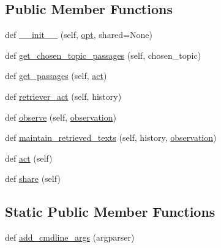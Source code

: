 \subsection*{Public Member Functions}
\begin{DoxyCompactItemize}
\item 
def \hyperlink{classinteractive__end2end_1_1interactive__end2end_1_1InteractiveEnd2endAgent_ac0b40a7b2374f7b0dca4c123e0cfc2ed}{\+\_\+\+\_\+init\+\_\+\+\_\+} (self, \hyperlink{classinteractive__end2end_1_1interactive__end2end_1_1InteractiveEnd2endAgent_a85ea739abdd803414abe3e131c0965dd}{opt}, shared=None)
\item 
def \hyperlink{classinteractive__end2end_1_1interactive__end2end_1_1InteractiveEnd2endAgent_ad8ef18518675b9aa72280547b56d3a1e}{get\+\_\+chosen\+\_\+topic\+\_\+passages} (self, chosen\+\_\+topic)
\item 
def \hyperlink{classinteractive__end2end_1_1interactive__end2end_1_1InteractiveEnd2endAgent_a47de7bd0acb24fb9d76d6d1555253e9f}{get\+\_\+passages} (self, \hyperlink{classinteractive__end2end_1_1interactive__end2end_1_1InteractiveEnd2endAgent_a20a0561cd5fc7008644d4cc18adc8f42}{act})
\item 
def \hyperlink{classinteractive__end2end_1_1interactive__end2end_1_1InteractiveEnd2endAgent_a60ab442ea924f06664b432e9c3e9f7aa}{retriever\+\_\+act} (self, history)
\item 
def \hyperlink{classinteractive__end2end_1_1interactive__end2end_1_1InteractiveEnd2endAgent_a582ae9a8c09b4e0287c79748054eb956}{observe} (self, \hyperlink{classinteractive__end2end_1_1interactive__end2end_1_1InteractiveEnd2endAgent_a9c69a4218e497d150aa9ffb07cf57e21}{observation})
\item 
def \hyperlink{classinteractive__end2end_1_1interactive__end2end_1_1InteractiveEnd2endAgent_a76bebd5d1faa6d6aa243984106ee96d8}{maintain\+\_\+retrieved\+\_\+texts} (self, history, \hyperlink{classinteractive__end2end_1_1interactive__end2end_1_1InteractiveEnd2endAgent_a9c69a4218e497d150aa9ffb07cf57e21}{observation})
\item 
def \hyperlink{classinteractive__end2end_1_1interactive__end2end_1_1InteractiveEnd2endAgent_a20a0561cd5fc7008644d4cc18adc8f42}{act} (self)
\item 
def \hyperlink{classinteractive__end2end_1_1interactive__end2end_1_1InteractiveEnd2endAgent_a01ec12a5c02e3e38f0183945099bbbce}{share} (self)
\end{DoxyCompactItemize}
\subsection*{Static Public Member Functions}
\begin{DoxyCompactItemize}
\item 
def \hyperlink{classinteractive__end2end_1_1interactive__end2end_1_1InteractiveEnd2endAgent_ad6712805a88e2999f531f764022f2de4}{add\+\_\+cmdline\+\_\+args} (argparser)
\end{DoxyCompactItemize}
